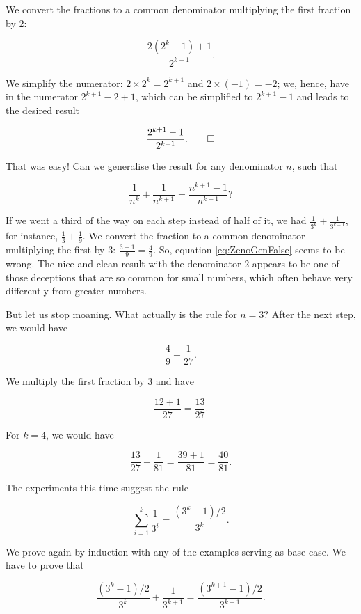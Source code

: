 \documentclass[tikz]{scrreprt}
\begin{document}
We convert the fractions to a common denominator
multiplying the first fraction by 2:

\[
\frac{2(2^k - 1) + 1}{2^{k+1}}.
\]

We simplify the numerator: 
$2 \times 2^k = 2^{k+1}$ and
$2 \times (-1) = -2$; we, hence, have in the numerator
$2^{k+1} - 2 + 1$, which can be simplified to
$2^{k+1} - 1$ and leads to the desired result

\[
\frac{2^{k+1} - 1}{2^{k+1}}.\qed
\]

That was easy!
Can we generalise the result for any denominator $n$,
such that

\begin{equation}\label{eq:ZenoGenFalse}
\frac{1}{n^k} + \frac{1}{n^{k+1}} = 
\frac{n^{k+1} - 1}{n^{k+1}}?
\end{equation}

If we went a third of the way on each step
instead of half of it, we had
$\frac{1}{3^k} + \frac{1}{3^{k+1}}$, for instance,
$\frac{1}{3} + \frac{1}{9}$.
We convert the fraction to a common 
denominator multiplying the first by 3:
$\frac{3+1}{9} = \frac{4}{9}$.
So, equation \ref{eq:ZenoGenFalse} seems to be wrong.
The nice and clean result with the denominator 2
appears to be one of those deceptions that are so common
for small numbers, which often behave very differently
from greater numbers.

But let us stop moaning. What actually is the rule
for $n=3$? After the next step, we would have

\[
\frac{4}{9} + \frac{1}{27}.
\] 

We multiply the first fraction by 3 and have

\[
\frac{12+1}{27} =
\frac{13}{27}.
\] 

For $k=4$, we would have

\[
\frac{13}{27} + \frac{1}{81} =
\frac{39 + 1}{81} =  \frac{40}{81}.
\] 

The experiments this time suggest the rule

\begin{equation}\label{eq:Zeno3}
\sum_{i=1}^k{\frac{1}{3^i}} = 
\frac{(3^k - 1) / 2}{3^k}.
\end{equation}

We prove again by induction with any of the examples
serving as base case.
We have to prove that 

\begin{equation}
\frac{(3^k - 1) / 2}{3^k} + \frac{1}{3^{k+1}} =
\frac{(3^{k+1} - 1) / 2}{3^{k+1}}.
\end{equation}
\end{document}
